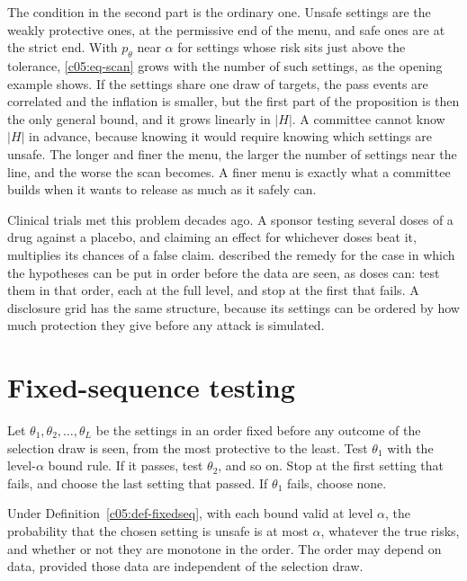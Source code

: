 The condition in the second part is the ordinary one. Unsafe settings are the weakly
protective ones, at the permissive end of the menu, and safe ones are at the strict end.
With $p_\theta$ near $\alpha$ for settings whose risk sits just above the tolerance,
\eqref{c05:eq-scan} grows with the number of such settings, as the opening example shows.
If the settings share one draw of targets, the pass events are correlated and the
inflation is smaller, but the first part of the proposition is then the only general
bound, and it grows linearly in $|H|$. A committee cannot know $|H|$ in advance, because
knowing it would require knowing which settings are unsafe. The longer and finer the
menu, the larger the number of settings near the line, and the worse the scan becomes.
A finer menu is exactly what a committee builds when it wants to release as much as it
safely can.

Clinical trials met this problem decades ago. A sponsor testing several doses of a drug
against a placebo, and claiming an effect for whichever doses beat it, multiplies its
chances of a false claim. \citet{maurer1995} described the remedy for the case in which
the hypotheses can be put in order before the data are seen, as doses can: test them in
that order, each at the full level, and stop at the first that fails. A disclosure grid
has the same structure, because its settings can be ordered by how much protection they
give before any attack is simulated.

\section{Fixed-sequence testing}

\begin{definition}\label{c05:def-fixedseq}
Let $\theta_1, \theta_2, \dots, \theta_L$ be the settings in an order fixed before any
outcome of the selection draw is seen, from the most protective to the least. Test
$\theta_1$ with the level-$\alpha$ bound rule. If it passes, test $\theta_2$, and so on.
Stop at the first setting that fails, and choose the last setting that passed. If
$\theta_1$ fails, choose none.
\end{definition}

\begin{proposition}\label{c05:prop-fixedseq}
Under Definition~\ref{c05:def-fixedseq}, with each bound valid at level $\alpha$, the
probability that the chosen setting is unsafe is at most $\alpha$, whatever the true
risks, and whether or not they are monotone in the order. The order may depend on data,
provided those data are independent of the selection draw.
\end{proposition}

